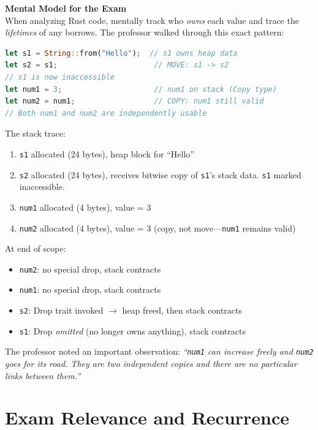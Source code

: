 \begin{exambox}
\textbf{Mental Model for the Exam} \\
When analyzing Rust code, mentally track who \emph{owns} each value and trace the \emph{lifetimes} of any borrows. The professor walked through this exact pattern:

\begin{lstlisting}[language=Rust]
let s1 = String::from("Hello");  // s1 owns heap data
let s2 = s1;                      // MOVE: s1 -> s2
// s1 is now inaccessible
let num1 = 3;                     // num1 on stack (Copy type)
let num2 = num1;                  // COPY: num1 still valid
// Both num1 and num2 are independently usable
\end{lstlisting}

The stack trace:
\begin{enumerate}
    \item \texttt{s1} allocated (24 bytes), heap block for ``Hello''
    \item \texttt{s2} allocated (24 bytes), receives bitwise copy of \texttt{s1}'s stack data. \texttt{s1} marked inaccessible.
    \item \texttt{num1} allocated (4 bytes), value = 3
    \item \texttt{num2} allocated (4 bytes), value = 3 (copy, not move---\texttt{num1} remains valid)
\end{enumerate}

At end of scope:
\begin{itemize}
    \item \texttt{num2}: no special drop, stack contracts
    \item \texttt{num1}: no special drop, stack contracts
    \item \texttt{s2}: Drop trait invoked $\rightarrow$ heap freed, then stack contracts
    \item \texttt{s1}: Drop \emph{omitted} (no longer owns anything), stack contracts
\end{itemize}

The professor noted an important observation: \emph{``\texttt{num1} can increase freely and \texttt{num2} goes for its road. They are two independent copies and there are no particular links between them.''}
\end{exambox}

\section*{Exam Relevance and Recurrence}

